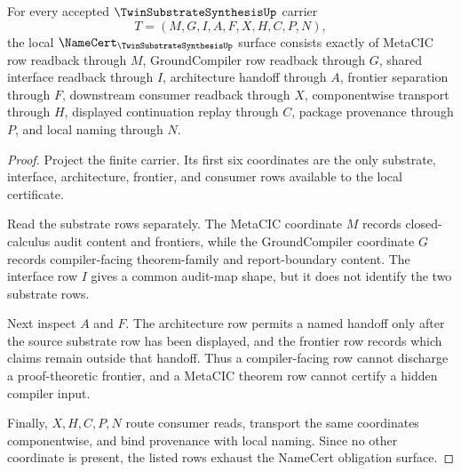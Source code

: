 \begin{theorem}
\label{thm:twin-substrate-synthesis-namecert-obligations}
For every accepted $\TwinSubstrateSynthesisUp$ carrier
$$
T=(M,G,I,A,F,X,H,C,P,N),
$$
the local $\NameCert_{\TwinSubstrateSynthesisUp}$ surface consists exactly of MetaCIC row readback through $M$, GroundCompiler row readback through $G$, shared interface readback through $I$, architecture handoff through $A$, frontier separation through $F$, downstream consumer readback through $X$, componentwise transport through $H$, displayed continuation replay through $C$, package provenance through $P$, and local naming through $N$.
\end{theorem}
\begin{proof}
Project the finite carrier. Its first six coordinates are the only substrate, interface, architecture, frontier, and consumer rows available to the local certificate.

Read the substrate rows separately. The MetaCIC coordinate $M$ records closed-calculus audit content and frontiers, while the GroundCompiler coordinate $G$ records compiler-facing theorem-family and report-boundary content. The interface row $I$ gives a common audit-map shape, but it does not identify the two substrate rows.

Next inspect $A$ and $F$. The architecture row permits a named handoff only after the source substrate row has been displayed, and the frontier row records which claims remain outside that handoff. Thus a compiler-facing row cannot discharge a proof-theoretic frontier, and a MetaCIC theorem row cannot certify a hidden compiler input.

Finally, $X,H,C,P,N$ route consumer reads, transport the same coordinates componentwise, and bind provenance with local naming. Since no other coordinate is present, the listed rows exhaust the NameCert obligation surface.
\end{proof}

